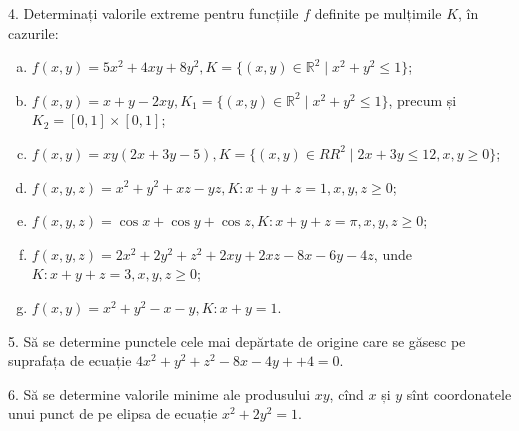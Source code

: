 \documentclass[11pt,a4paper]{article}
\newcommand\RR{\mathbb{R}}
\theoremstyle{dotless}
\theoremstyle{dotlessdr}
\begin{document}
\vspace{1cm}

4. Determinați valorile extreme pentru funcțiile $f$ definite pe mulțimile $K$,
în cazurile:
\begin{enumerate}[(a)]
\item $f(x, y) = 5x^2 + 4xy + 8y^2, K = \{(x,y) \in \RR^2 \mid x^2 + y^2 \leq 1 \}$;
\item $f(x, y) = x + y - 2xy, K_1 = \{ (x, y) \in \RR^2 \mid x^2 + y^2 \leq 1 \}$,
  precum și $K_2 = [0, 1] \times [0, 1]$;
\item $f(x, y) = xy(2x + 3y - 5), K = \{(x, y) \in RR^2 \mid 2x + 3y \leq 12, x,y \geq 0\}$;
\item $f(x, y, z) = x^2 + y^2 + xz - yz, K: x + y + z = 1, x,y,z \geq 0$;
\item $f(x, y, z) = \cos x + \cos y + \cos z, K: x + y + z = \pi, x, y, z \geq 0$;
\item $f(x, y, z) = 2x^2 + 2y^2 + z^2 + 2xy + 2xz - 8x - 6y - 4z$, unde
  $K: x + y + z = 3, x,y,z \geq 0$;
\item $f(x,y) = x^2 + y^2 - x - y, K: x + y = 1$.
\end{enumerate}

\vspace{1cm}

5. Să se determine punctele cele mai depărtate de origine care se găsesc pe suprafața
de ecuație $4x^2 + y^2 + z^2 - 8x - 4y + + 4 = 0$.

\vspace{1cm}

6. Să se determine valorile minime ale produsului $xy$, cînd $x$ și $y$ sînt coordonatele
unui punct de pe elipsa de ecuație $x^2 + 2y^2 = 1$.
\end{document}
